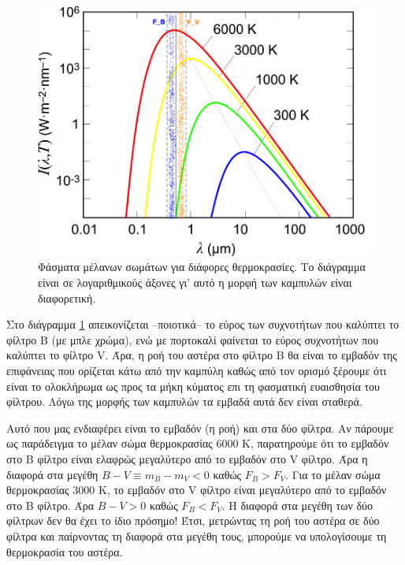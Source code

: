 \begin{figure}[h]
    \centering
    \includegraphics[width=\linewidth]{Figures/Planck_law_log_log_scale.png}
    \caption{Φάσματα μέλανων σωμάτων για διάφορες θερμοκρασίες. Το διάγραμμα είναι σε λογαριθμικούς άξονες γι' αυτό η μορφή των καμπυλών είναι διαφορετική.}
    \label{fig:planck_law_log_scale}
\end{figure}

Στο διάγραμμα \ref{fig:planck_law_log_scale} απεικονίζεται --ποιοτικά-- το εύρος των συχνοτήτων που καλύπτει το φίλτρο B (με μπλε χρώμα), ενώ με πορτοκαλί φαίνεται το εύρος συχνοτήτων που καλύπτει το φίλτρο V. {\color{blue} Άρα, η ροή του αστέρα στο φίλτρο B θα είναι το εμβαδόν της επιφάνειας που ορίζεται κάτω από την καμπύλη καθώς από τον ορισμό ξέρουμε ότι είναι το ολοκλήρωμα ως προς τα μήκη κύματος επι τη φασματική ευαισθησία του φίλτρου. Λόγω της μορφής των καμπυλών τα εμβαδά αυτά δεν είναι σταθερά}.

Αυτό που μας ενδιαφέρει είναι το εμβαδόν (η ροή) και στα δύο φίλτρα. Αν πάρουμε ως παράδειγμα το μέλαν σώμα θερμοκρασίας 6000 Κ, παρατηρούμε ότι το εμβαδόν στο B φίλτρο είναι ελαφρώς μεγαλύτερο από το εμβαδόν στο V φίλτρο. Άρα η διαφορά στα μεγέθη $B - V \equiv m_B - m_V < 0$ καθώς $F_B > F_V$.
Για το μέλαν σώμα θερμοκρασίας 3000 Κ, το εμβαδόν στο V φίλτρο είναι μεγαλύτερο από το εμβαδόν στο B φίλτρο. Άρα $B - V > 0$ καθώς $F_B < F_V$.
{\color{red} Η διαφορά στα μεγέθη των δύο φίλτρων δεν θα έχει το ίδιο πρόσημο! Έτσι, μετρώντας τη ροή του αστέρα σε δύο φίλτρα και παίρνοντας τη διαφορά στα μεγέθη τους, μπορούμε να υπολογίσουμε τη θερμοκρασία του αστέρα.}

